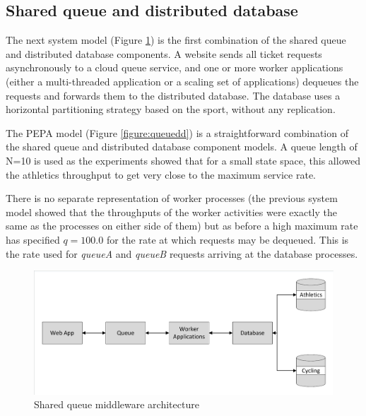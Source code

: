 \documentclass[runningheads]{llncs}
\begin{document}
%
%
\FloatBarrier
\subsection{Shared queue and distributed database}
The next system model (Figure \ref{figure:queuedd_architecture}) is the first combination of the shared queue and distributed database components.  A website sends all ticket requests asynchronously to a cloud queue service, and one or more worker applications (either a multi-threaded application or a scaling set of applications) dequeues the requests and forwards them to the distributed database.  The database uses a horizontal partitioning strategy based on the sport, without any replication.

The PEPA model (Figure \ref{figure:queuedd}) is a straightforward combination of the shared queue and distributed database component models.  A queue length of N=10 is used as the experiments showed that for a small state space, this allowed the athletics throughput to get very close to the maximum service rate.

There is no separate representation of worker processes (the previous system model showed that the throughputs of the worker activities were exactly the same as the processes on either side of them) but as before a high maximum rate has specified $\mathit{q=100.0}$ for the rate at which requests may be dequeued.  This is the rate used for {\itshape queueA} and {\itshape queueB} requests arriving at the database processes.

\begin{figure}
	\centering
	\includegraphics[trim = 5 5 5 5, clip, width=\textwidth]{img/sharedqueue}
	\caption{Shared queue middleware architecture}
	\label{figure:queuedd_architecture}
\end{figure}
\end{document}
